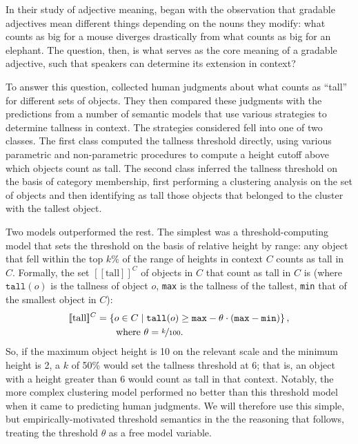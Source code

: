 \documentclass[10pt,a4paper]{article}
\newcommand{\den}[1]{\ensuremath{[\![#1]\!]}}
\begin{document}
In their study of adjective meaning,  began with the observation that gradable adjectives mean different things depending on the nouns they modify: what counts as big for a mouse diverges drastically from what counts as big for an elephant. The question, then, is what serves as the core meaning of a gradable adjective, such that speakers can determine its extension in context? 
 
To answer this question, \citeauthor{schmidtetal2009} collected human judgments about what counts as ``tall'' for different sets of objects. They then compared these judgments with the predictions from a number of semantic models that use various strategies to determine tallness in context. The strategies considered fell into one of two classes. The first class computed the tallness threshold directly, using various parametric and non-parametric procedures to compute a height cutoff above which objects count as tall. The second class inferred the tallness threshold on the basis of category membership, first performing a clustering analysis on the set of objects and then identifying as tall those objects that belonged to the cluster with the tallest object.

Two models outperformed the rest. The simplest was a threshold-computing model that sets the threshold on the basis of relative height by range: any object that fell within the top $k\%$ of the range of heights in context $C$ counts as tall in $C$. Formally, the set $\den{\text{tall}}^C$ of objects in $C$ that count as tall in $C$ is (where $\texttt{tall}(o)$ is the tallness of object $o$, \texttt{max} is the tallness of the tallest, \texttt{min} that of the smallest object in $C$):
\begin{align}
  \label{eq:Semantics}
  \den{\text{tall}}^C & = \{ o \in C \mid \texttt{tall}(o) \ge \texttt{max} - \theta \cdot (\texttt{max} - \texttt{min}) \} \,, \\
  & \ \ \ \ \ \ \text{where $\theta = \nicefrac{k}{100}$.} \nonumber
\end{align}
So, if the maximum object height is 10 on the relevant scale and the minimum height is 2, a $k$ of 50\% would set the tallness threshold at 6; that is, an object with a height greater than 6 would count as tall in that context. Notably, the more complex clustering model performed no better than this threshold model when it came to predicting human judgments. We will therefore use this simple, but empirically-motivated threshold semantics in the the reasoning that follows, treating the threshold $\theta$ as a free model variable.
\end{document}
